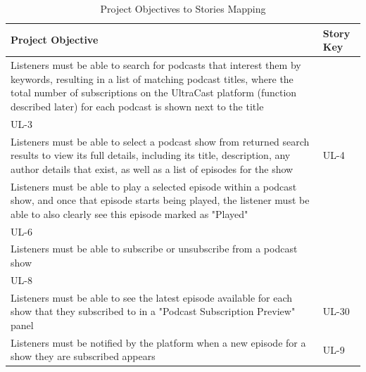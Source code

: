 \documentclass[12pt]{article}
\begin{document}
\begin{table}
    \centering
    \caption{Project Objectives to Stories Mapping}
    \label{table:project_objectives_to_stories}
    \bigskip
    \begin{tabularx}{\linewidth}{|>{\hsize=1.8\hsize}X|>{\hsize=0.2\hsize}X|}
        \hline
        \textbf{Project Objective}                                             & \textbf{Story Key} \\
        \hline
        Listeners must be able to search for podcasts that interest them by keywords, resulting in a list of matching podcast titles, where the total number of subscriptions on the UltraCast platform (function described later) for each podcast is shown next to the title                                             & \begin{tabular}[c]{@{}l@{}}UL-2\\ UL-3\end{tabular}          \\ \hline
        Listeners must be able to select a podcast show from returned search results to view its full details, including its title, description, any author details that exist, as well as a list of episodes for the show                                             & UL-4                               \\ \hline
        Listeners must be able to play a selected episode within a podcast show, and once that episode starts being played, the listener must be able to also clearly see this episode marked as "Played"                                             & \begin{tabular}[c]{@{}l@{}}UL-5\\ UL-6\end{tabular}          \\ \hline
        Listeners must be able to subscribe or unsubscribe from a podcast show & \begin{tabular}[c]{@{}l@{}}UL-7\\ UL-8\end{tabular}         \\ \hline
        Listeners must be able to see the latest episode available for each show that they subscribed to in a "Podcast Subscription Preview" panel                                            & UL-30                              \\ \hline
        Listeners must be notified by the platform when a new episode for a show  they are subscribed appears                                             & UL-9                               \\ \hline

\end{tabularx}
\end{table}
\end{document}
